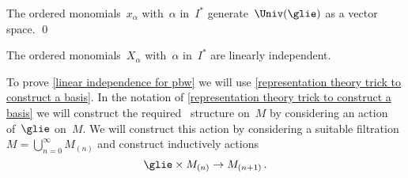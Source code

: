 \begin{corollary}
	\label{generating for pbw}
	The ordered monomials~$x_\alpha$ with~$\alpha$ in~$I^*$ generate~$\Univ(\glie)$ as a vector space.
	\qed
\end{corollary}


\begin{lemma}
	\label{linear independence for pbw}
	The ordered monomials~$X_\alpha$ with~$\alpha$ in~$I^*$ are linearly independent.
\end{lemma}


\begin{fluff}
	To prove \cref{linear independence for pbw} we will use \cref{representation theory trick to construct a basis}.
	In the notation of \cref{representation theory trick to construct a basis} we will construct the required~\module{$\Univ(\glie)$} structure on~$M$ by considering an action of~$\glie$ on~$M$.
	We will construct this action by considering a suitable filtration~$M = \bigcup_{n=0}^\infty M_{(n)}$ and construct inductively actions
	\[
		\glie \times M_{(n)}
		\to
		M_{(n+1)} \,.
	\]
\end{fluff}



